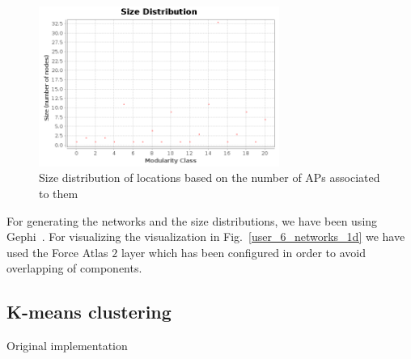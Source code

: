\begin{figure}[!h]
\centering
\includegraphics[width=0.7\textwidth]{figures/networks/communities-size-distribution.png}
\caption{Size distribution of locations based on the number of APs associated to
them }
\label{user_6_size_distribution_1d}
\end{figure}

For generating the networks and the size distributions, we have been using
Gephi~\cite{Gephi}. For visualizing the visualization in
Fig.~\ref{user_6_networks_1d} we have used the Force Atlas $2$ layer which has
been configured in order to avoid overlapping of components.

\subsection{K-means clustering}
Original \cite{Macqueen67somemethods} implementation \cite{linde1980algorithm}




